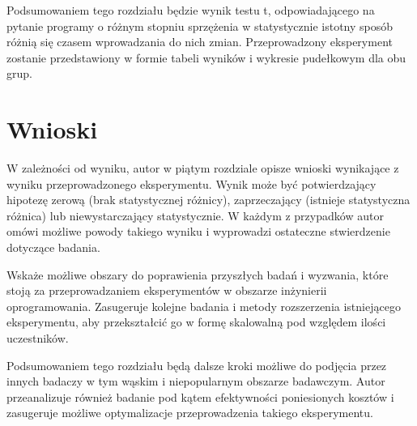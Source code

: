 Podsumowaniem tego rozdziału będzie wynik testu t, odpowiadającego na pytanie programy o różnym stopniu
sprzężenia w statystycznie istotny sposób różnią się czasem wprowadzania do nich zmian.
Przeprowadzony eksperyment zostanie przedstawiony w formie tabeli wyników i wykresie pudełkowym dla obu grup.

\chapter{Wnioski}

W zależności od wyniku, autor w piątym rozdziale opisze wnioski wynikające z wyniku przeprowadzonego eksperymentu.
Wynik może być potwierdzający hipotezę zerową (brak statystycznej różnicy), zaprzeczający (istnieje statystyczna
różnica) lub niewystarczający statystycznie.
W każdym z przypadków autor omówi możliwe powody takiego wyniku i wyprowadzi ostateczne stwierdzenie dotyczące badania.

Wskaże możliwe obszary do poprawienia przyszłych badań i wyzwania, które stoją za przeprowadzaniem eksperymentów
w obszarze inżynierii oprogramowania.
Zasugeruje kolejne badania i metody rozszerzenia istniejącego eksperymentu, aby przekształcić go w formę skalowalną
pod względem ilości uczestników.

Podsumowaniem tego rozdziału będą dalsze kroki możliwe do podjęcia przez innych badaczy w tym wąskim
i niepopularnym obszarze badawczym.
Autor przeanalizuje również badanie pod kątem efektywności poniesionych kosztów i zasugeruje możliwe
optymalizacje przeprowadzenia takiego eksperymentu.
